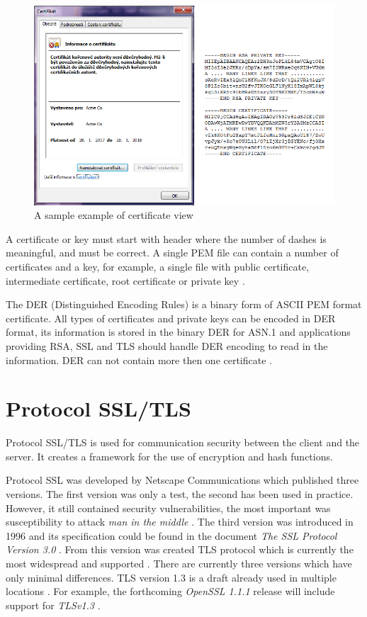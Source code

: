 \documentclass[
  digital, %
  notable,   %
  lof,     %
  lot,     %
]{fithesis3}
\begin{document}
\begin{figure}[th]
	\centering
	\includegraphics[width=1\textwidth]{pem-der}
	\caption{A sample example of certificate view}
	\label{fig:vzorPEM-DER}
\end{figure}

A certificate or key must start with header where the number of dashes is meaningful, and must 
be correct. A single PEM file can contain a number of certificates and a key, for example, a 
single file with public certificate, intermediate certificate, root certificate or private key 
\cite{howToSsl}.

The DER (Distinguished Encoding Rules) is a binary form of ASCII PEM format 
certificate. All types of certificates and private keys can be encoded in DER format, its 
information is stored in the binary DER for ASN.1 and applications providing RSA, SSL and TLS 
should handle DER encoding to read in the information. DER can not contain more then one certificate \cite{bakker_2014}.

\section{Protocol SSL/TLS}
Protocol SSL/TLS is used for communication security between the client and the server. It 
creates a framework for the use of encryption and hash functions.

Protocol SSL was developed by Netscape Communications which published three versions. The first 
version was only a test, the second has been used in practice. However, it still contained 
security vulnerabilities, the most important was susceptibility to attack \textit{man in the 
middle} \cite{oppliger2003security}. %
The third version was introduced in 1996 and its specification could be found in the document 
\textit{The SSL Protocol Version 3.0} \cite{freier2011secure}. From this version was created TLS 
protocol which is currently the most widespread and supported \cite{oppliger2003security}. 
There are currently three versions which have only minimal differences. TLS version 1.3 is a draft 
already used in multiple locations \cite{draft-tls}. For example, the forthcoming \textit{OpenSSL 1.1.1} release will include support for \textit{TLSv1.3} \cite{foundation2}.
\end{document}
